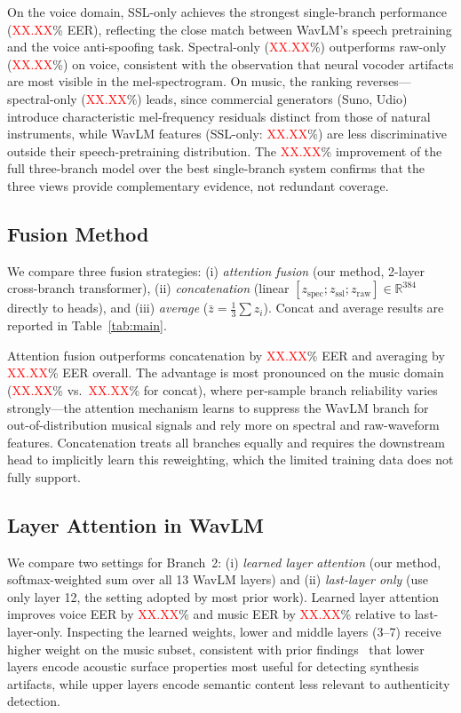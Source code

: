 \documentclass[10pt,twocolumn,a4paper]{article}
\newcommand{\NUM}{\textcolor{red}{XX.XX}}
\begin{document}
On the voice domain, SSL-only achieves the strongest single-branch performance (\NUM\% EER), reflecting the close match between WavLM's speech pretraining and the voice anti-spoofing task. Spectral-only (\NUM\%) outperforms raw-only (\NUM\%) on voice, consistent with the observation that neural vocoder artifacts are most visible in the mel-spectrogram. On music, the ranking reverses---spectral-only (\NUM\%) leads, since commercial generators (Suno, Udio) introduce characteristic mel-frequency residuals distinct from those of natural instruments, while WavLM features (SSL-only: \NUM\%) are less discriminative outside their speech-pretraining distribution. The \NUM\% improvement of the full three-branch model over the best single-branch system confirms that the three views provide complementary evidence, not redundant coverage.

\subsection{Fusion Method}

We compare three fusion strategies: (i) \textit{attention fusion} (our method, 2-layer cross-branch transformer), (ii) \textit{concatenation} (linear $[z_{\text{spec}}; z_{\text{ssl}}; z_{\text{raw}}] \in \mathbb{R}^{384}$ directly to heads), and (iii) \textit{average} ($\bar{z} = \tfrac{1}{3}\sum z_i$). Concat and average results are reported in Table~\ref{tab:main}.

Attention fusion outperforms concatenation by \NUM\% EER and averaging by \NUM\% EER overall. The advantage is most pronounced on the music domain (\NUM\% vs.\ \NUM\% for concat), where per-sample branch reliability varies strongly---the attention mechanism learns to suppress the WavLM branch for out-of-distribution musical signals and rely more on spectral and raw-waveform features. Concatenation treats all branches equally and requires the downstream head to implicitly learn this reweighting, which the limited training data does not fully support.

\subsection{Layer Attention in WavLM}

We compare two settings for Branch~2: (i) \textit{learned layer attention} (our method, softmax-weighted sum over all 13 WavLM layers) and (ii) \textit{last-layer only} (use only layer 12, the setting adopted by most prior work). Learned layer attention improves voice EER by \NUM\% and music EER by \NUM\% relative to last-layer-only. Inspecting the learned weights, lower and middle layers (3--7) receive higher weight on the music subset, consistent with prior findings~\cite{ssl_layer_fusion_2025} that lower layers encode acoustic surface properties most useful for detecting synthesis artifacts, while upper layers encode semantic content less relevant to authenticity detection.
\end{document}
